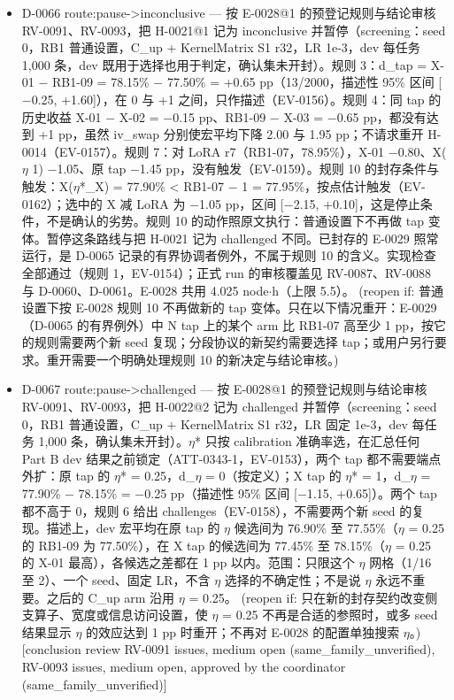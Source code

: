 \documentclass[11pt]{article}
\begin{document}
\begin{itemize}
\item D-0066 route:pause-\textgreater{}inconclusive --- 按 E-0028@1 的预登记规则与结论审核 RV-0091、RV-0093，把 H-0021@1 记为 inconclusive 并暂停（screening：seed 0，RB1 普通设置，C\_up + KernelMatrix S1 r32，LR 1e-3，dev 每任务 1,000 条，dev 既用于选择也用于判定，确认集未开封）。规则 3：d\_tap = X-01 \ensuremath{-} RB1-09 = 78.15\% \ensuremath{-} 77.50\% = +0.65 pp（13/2000，描述性 95\% 区间 [\ensuremath{-}0.25, +1.60]），在 0 与 +1 之间，只作描述（EV-0156）。规则 4：同 tap 的历史收益 X-01 \ensuremath{-} X-02 = \ensuremath{-}0.15 pp、RB1-09 \ensuremath{-} X-03 = \ensuremath{-}0.65 pp，都没有达到 +1 pp，虽然 iv\_swap 分别使宏平均下降 2.00 与 1.95 pp；不请求重开 H-0014（EV-0157）。规则 7：对 LoRA r7（RB1-07，78.95\%），X-01 \ensuremath{-}0.80、X(\ensuremath{\eta} 1) \ensuremath{-}1.05、原 tap \ensuremath{-}1.45 pp，没有触发（EV-0159）。规则 10 的封存条件与触发：X(\ensuremath{\eta}*\_X) = 77.90\% \textless{} RB1-07 \ensuremath{-} 1 = 77.95\%，按点估计触发（EV-0162）；选中的 X 减 LoRA 为 \ensuremath{-}1.05 pp，区间 [\ensuremath{-}2.15, +0.10]，这是停止条件，不是确认的劣势。规则 10 的动作照原文执行：普通设置下不再做 tap 变体。暂停这条路线与把 H-0021 记为 challenged 不同。已封存的 E-0029 照常运行，是 D-0065 记录的有界协调者例外，不属于规则 10 的含义。实现检查全部通过（规则 1，EV-0154）；正式 run 的审核覆盖见 RV-0087、RV-0088 与 D-0060、D-0061。E-0028 共用 4.025 node\ensuremath{\cdot}h（上限 5.5）。 (reopen if: 普通设置下按 E-0028 规则 10 不再做新的 tap 变体。只在以下情况重开：E-0029（D-0065 的有界例外）中 N tap 上的某个 arm 比 RB1-07 高至少 1 pp，按它的规则需要两个新 seed 复现；分段协议的新契约需要选择 tap；或用户另行要求。重开需要一个明确处理规则 10 的新决定与结论审核。)
\item D-0067 route:pause-\textgreater{}challenged --- 按 E-0028@1 的预登记规则与结论审核 RV-0091、RV-0093，把 H-0022@2 记为 challenged 并暂停（screening：seed 0，RB1 普通设置，C\_up + KernelMatrix S1 r32，LR 固定 1e-3，dev 每任务 1,000 条，确认集未开封）。\ensuremath{\eta}* 只按 calibration 准确率选，在汇总任何 Part B dev 结果之前锁定（ATT-0343-1，EV-0153），两个 tap 都不需要端点外扩：原 tap 的 \ensuremath{\eta}* = 0.25，d\_\ensuremath{\eta} = 0（按定义）；X tap 的 \ensuremath{\eta}* = 1，d\_\ensuremath{\eta} = 77.90\% \ensuremath{-} 78.15\% = \ensuremath{-}0.25 pp（描述性 95\% 区间 [\ensuremath{-}1.15, +0.65]）。两个 tap 都不高于 0，规则 6 给出 challenges（EV-0158），不需要两个新 seed 的复现。描述上，dev 宏平均在原 tap 的 \ensuremath{\eta} 候选间为 76.90\% 至 77.55\%（\ensuremath{\eta} = 0.25 的 RB1-09 为 77.50\%），在 X tap 的候选间为 77.45\% 至 78.15\%（\ensuremath{\eta} = 0.25 的 X-01 最高），各候选之差都在 1 pp 以内。范围：只限这个 \ensuremath{\eta} 网格（1/16 至 2）、一个 seed、固定 LR，不含 \ensuremath{\eta} 选择的不确定性；不是说 \ensuremath{\eta} 永远不重要。之后的 C\_up arm 沿用 \ensuremath{\eta} = 0.25。 (reopen if: 只在新的封存契约改变侧支算子、宽度或信息访问设置，使 \ensuremath{\eta} = 0.25 不再是合适的参照时，或多 seed 结果显示 \ensuremath{\eta} 的效应达到 1 pp 时重开；不再对 E-0028 的配置单独搜索 \ensuremath{\eta}。) [conclusion review RV-0091 issues, medium open (same\_family\_unverified), RV-0093 issues, medium open, approved by the coordinator (same\_family\_unverified)]

\end{itemize}
\end{document}
